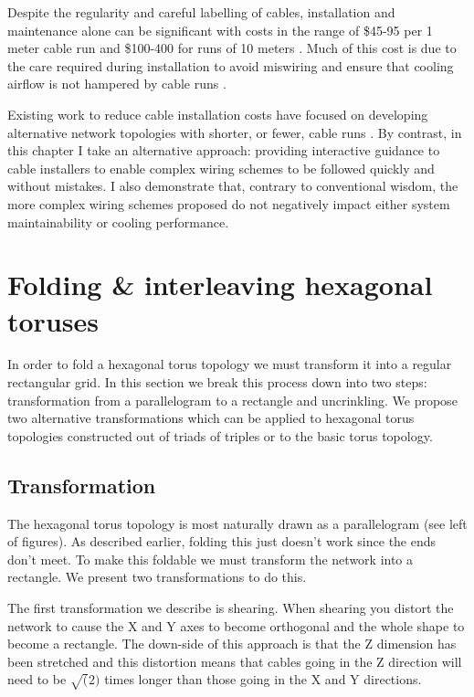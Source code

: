 			Despite the regularity and careful labelling of cables, installation and
			maintenance alone can be significant with costs in the range of \$45-95
			per 1 meter cable run and \$100-400 for runs of 10 meters
			\cite{mudigonda11}. Much of this cost is due to the care required during
			installation to avoid miswiring and ensure that cooling airflow is not
			hampered by cable runs \cite{cisco07}.
			
			Existing work to reduce cable installation costs have focused on
			developing alternative network topologies with shorter, or fewer, cable
			runs \cite{curtis12, popa10, mudigonda11}. By contrast, in this chapter I
			take an alternative approach: providing interactive guidance to cable
			installers to enable complex wiring schemes to be followed quickly and
			without mistakes. I also demonstrate that, contrary to conventional
			wisdom, the more complex wiring schemes proposed do not negatively impact
			either system maintainability or cooling performance.
	
	\section{Folding \& interleaving hexagonal toruses}
		
		In order to fold a hexagonal torus topology we must transform it into a
		regular rectangular grid. In this section we break this process down into
		two steps: transformation from a parallelogram to a rectangle and
		uncrinkling. We propose two alternative transformations which can be
		applied to hexagonal torus topologies constructed out of triads of triples
		or to the basic torus topology.
		
		\subsection{Transformation}
			
			The hexagonal torus topology is most naturally drawn as a parallelogram
			(see left of figures). As described earlier, folding this just doesn't
			work since the ends don't meet. To make this foldable we must transform
			the network into a rectangle. We present two transformations to do this.
			
			The first transformation we describe is shearing. When shearing you
			distort the network to cause the X and Y axes to become orthogonal and
			the whole shape to become a rectangle. The down-side of this approach is
			that the Z dimension has been stretched and this distortion means that
			cables going in the Z direction will need to be $\sqrt(2)$ times longer
			than those going in the X and Y directions.
			
